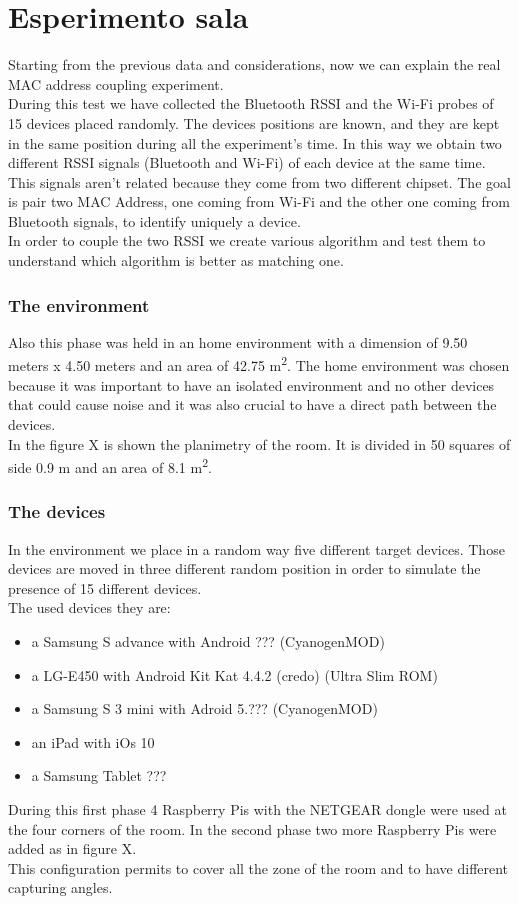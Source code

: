 \section{Esperimento sala}
Starting from the previous data and considerations, now we can explain the real MAC address coupling experiment.\\
During this test we have collected the Bluetooth RSSI and the Wi-Fi probes of 15 devices placed randomly. The devices positions are known, and they are kept in the same position during all the experiment's time. In this way we obtain two different RSSI signals (Bluetooth and Wi-Fi) of each device at the same time. This signals aren't related because they come from two different chipset. The goal is pair two MAC Address, one coming from Wi-Fi and the other one coming from Bluetooth signals, to identify uniquely a device.\\
In order to couple the two RSSI we create various algorithm and test them to understand which algorithm is better as matching one.

\subsubsection{The environment}
Also this phase was held in an home environment with a dimension of 9.50 meters x 4.50 meters and an area of 42.75 m\textsuperscript{2}.
The home environment was chosen because it was important to have an isolated environment and no other devices that could cause noise and it was also crucial to have a direct path between the devices.\\
In the figure X is shown the planimetry of the room. It is divided in 50 squares of side 0.9 m and an area of 8.1 m\textsuperscript{2}.
\subsubsection{The devices}
In the environment we place in a random way five different target devices. Those devices are moved in three different random position in order to simulate the presence of 15 different devices.\\
The used devices they are:
\begin{itemize}
\item a Samsung S advance with Android ??? (CyanogenMOD)
\item a LG-E450 with Android Kit Kat 4.4.2 (credo) (Ultra Slim ROM)
\item a Samsung S 3 mini with Adroid 5.??? (CyanogenMOD)
\item an iPad with iOs 10
\item a Samsung Tablet ???
\end{itemize}
During this first phase 4 Raspberry Pis with the NETGEAR dongle were used at the four corners of the room. In the second phase two more Raspberry Pis were added as in figure X. \\
This configuration permits to cover all the zone of the room and to have different capturing angles.

